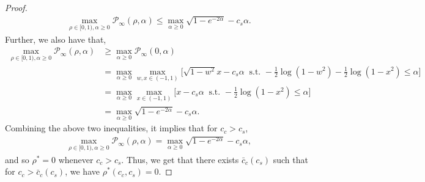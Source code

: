 \documentclass[10pt,a4paper]{amsart}
\begin{document}
\begin{proof}
\begin{align*}
    \max_{\rho\in[0,1) , \alpha\geq 0} \mathcal{P}_\infty (\rho, \alpha) \leq \max_{\alpha\geq 0} \sqrt{1-e^{-2\alpha}} - c_s \alpha.
\end{align*}
Further, we also have that,
\begin{align*}
    \max_{\rho\in[0,1) , \alpha\geq 0} \mathcal{P}_\infty (\rho, \alpha) & \geq \max_{ \alpha\geq 0} \mathcal{P}_\infty (0, \alpha) \\
    & = \max_{ \alpha\geq 0} \max_{w, x \in (-1,1)} \Big[\sqrt{1-w^2} x - c_s \alpha \ \text{ s.t. } -\frac{1}{2} \log(1-w^2) -\frac{1}{2} \log(1-x^2)  \leq \alpha \Big]\\
    & = \max_{ \alpha\geq 0}  \max_{x \in (-1,1)} \Big[ x - c_s \alpha \ \text{ s.t. } -\frac{1}{2} \log(1-x^2)  \leq \alpha\Big]\\
    & = \max_{\alpha\geq 0} \sqrt{1-e^{-2\alpha}} - c_s \alpha.
\end{align*}
Combining the above two inequalities, it implies that for $c_c>c_s$,
\begin{align*}
    \max_{\rho\in[0,1) , \alpha\geq 0} \mathcal{P}_\infty (\rho, \alpha) = \max_{\alpha\geq 0} \sqrt{1-e^{-2\alpha}} - c_s \alpha,
\end{align*}
and so $\rho^* = 0$ whenever $c_c>c_s$. Thus, we get that there exists $\bar c_c(c_s)$ such that for $c_c>\bar c_c(c_s)$, we have $\rho^*(c_c,c_s) =0$.
\end{proof}
\end{document}
